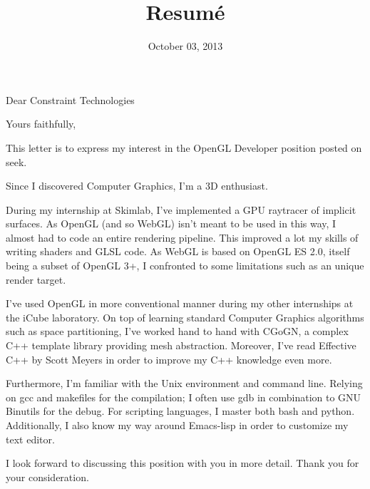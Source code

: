 \documentclass[11pt,a4paper,sans]{moderncv}        %
\title{Resumé}                               %
\begin{document}
\date{October 03, 2013}
\opening{Dear Constraint Technologies}
\closing{Yours faithfully,}

\makelettertitle

This letter is to express my interest in the OpenGL Developer position posted on seek.

Since I discovered Computer Graphics, I'm a 3D enthusiast.

During my internship at Skimlab, I've implemented a GPU raytracer of implicit surfaces. As OpenGL (and so WebGL) isn't meant to be used in this way,
I almost had to code an entire rendering pipeline. This improved a lot my skills of writing shaders and GLSL code.
As WebGL is based on OpenGL ES 2.0, itself being a subset of OpenGL 3+,
I confronted to some limitations such as an unique render target.

I've used OpenGL in more conventional manner during my other internships at the iCube laboratory.
On top of learning standard Computer Graphics algorithms such as space partitioning,
I've worked hand to hand with CGoGN, a complex C++ template library providing mesh abstraction.
Moreover, I've read Effective C++ by Scott Meyers in order to improve my C++ knowledge even more.

Furthermore, I'm familiar with the Unix environment and command line.
Relying on gcc and makefiles for the compilation; I often use gdb in combination to GNU Binutils for the debug.
For scripting languages, I master both bash and python.
Additionally, I also know my way around Emacs-lisp in order to customize my text editor.

I look forward to discussing this position with you in more detail. Thank you for your consideration.

\makeletterclosing
\end{document}
